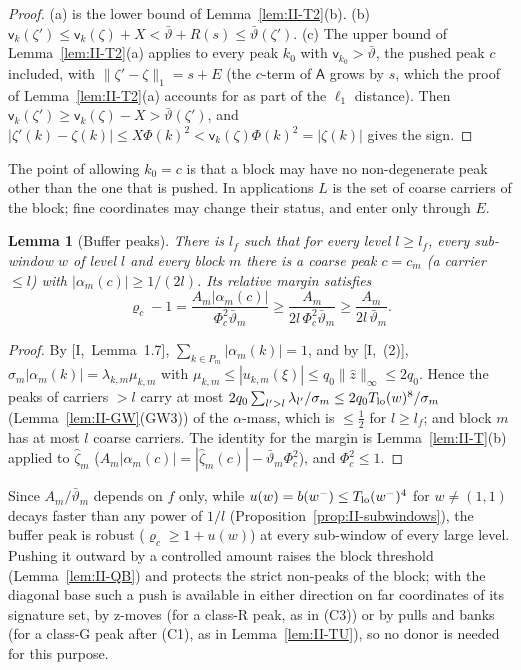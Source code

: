 \documentclass[10pt]{amsart}
\newtheorem{lemma}[theorem]{Lemma}
\theoremstyle{definition}
\theoremstyle{remark}
\newcommand{\zh}{\hat z}
\begin{document}
\begin{proof}
(a) is the lower bound of Lemma~\ref{lem:II-T2}(b).  (b) $\mathsf
v_k(\zeta')\le\mathsf v_k(\zeta)+X<\bar\vartheta+R(s)\le\bar\vartheta(\zeta')$.
(c) The upper bound of Lemma~\ref{lem:II-T2}(a) applies to every peak $k_0$
with $\mathsf v_{k_0}>\bar\vartheta$, the pushed peak $c$ included, with
$\|\zeta'-\zeta\|_1=s+E$ (the $c$-term of $\mathsf A$ grows by $s$, which the
proof of Lemma~\ref{lem:II-T2}(a) accounts for as part of the $\ell_1$
distance).  Then $\mathsf v_k(\zeta')\ge\mathsf v_k(\zeta)-X>\bar\vartheta
(\zeta')$, and $|\zeta'(k)-\zeta(k)|\le X\Phi(k)^2<\mathsf v_k(\zeta)\Phi(k)^2=
|\zeta(k)|$ gives the sign.
\end{proof}

The point of allowing $k_0=c$ is that a block may have no non-degenerate
peak other than the one that is pushed.  In applications $L$ is the set of
coarse carriers of the block; fine coordinates may change their status, and
enter only through $E$.

\begin{lemma}[Buffer peaks]\label{lem:II-buffer}
There is $l_f$ such that for every level $l\ge l_f$, every sub-window $w$
of level $l$ and every block $m$ there is a coarse peak $c=c_m$
\textup{(}a carrier $\le l$\textup{)} with $|\alpha_m(c)|\ge1/(2l)$.  Its
relative margin satisfies
\[
 \varrho_c-1=\frac{A_m|\alpha_m(c)|}{\Phi_c^2\bar\vartheta_m}\ge
 \frac{A_m}{2l\,\Phi_c^2\bar\vartheta_m}\ge\frac{A_m}{2l\,\bar\vartheta_m} .
\]
\end{lemma}

\begin{proof}
By [I,~Lemma~1.7], $\sum_{k\in P_m}|\alpha_m(k)|=1$, and by [I,~(2)],
$\sigma_m|\alpha_m(k)|=\lambda_{k,m}\mu_{k,m}$ with $\mu_{k,m}\le|u_{k,m}(\xi)|
\le q_0\|\zh\|_\infty\le2q_0$.  Hence the peaks of carriers $>l$ carry at
most $2q_0\sum_{l'>l}\lambda_{l'}/\sigma_m\le2q_0T_{\rm lo}(w)^8/\sigma_m$
(Lemma~\ref{lem:II-GW}(GW3)) of the $\alpha$-mass, which is $\le\frac12$ for
$l\ge l_f$; and block $m$ has at most $l$ coarse carriers.  The identity for
the margin is Lemma~\ref{lem:II-T}(b) applied to $\hat\zeta_m$
(${A_m}|\alpha_m(c)|=|\hat\zeta_m(c)|-\bar\vartheta_m\Phi_c^2$), and
$\Phi_c^2\le1$.
\end{proof}

Since $A_m/\bar\vartheta_m$ depends on $f$ only, while $u(w)=b(w^-)\le
T_{\rm lo}(w^-)^4$ for $w\ne(1,1)$ decays faster than any power of $1/l$
(Proposition~\ref{prop:II-subwindows}), the buffer peak is robust
($\varrho_c\ge1+u(w)$) at every sub-window of every large level.  Pushing it outward by a
controlled amount raises the block threshold (Lemma~\ref{lem:II-QB}) and
protects the strict non-peaks of the block; with the diagonal base such a
push is available in either direction on far coordinates of its signature
set, by z-moves (for a class-R peak, as in (C3)) or by pulls and banks (for
a class-G peak after (C1), as in Lemma~\ref{lem:II-TU}), so no donor is
needed for this purpose.
\end{document}

